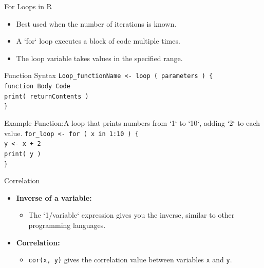 \documentclass{beamer}
\begin{document}
\begin{frame}{For Loops in R}
    \begin{itemize}
        \item Best used when the number of iterations is known.
        \item A `for` loop executes a block of code multiple times.
        \item The loop variable takes values in the specified range.
    \end{itemize}
        \begin{block}{Function Syntax}
        \texttt{Loop\_functionName <- loop ( parameters ) \{\\
        \quad function Body Code\\
        \quad print( returnContents )\\
        \}}
    \end{block}
        \begin{block}{Example Function:A loop that prints numbers from `1` to `10`, adding `2` to each value.}
        \texttt{for\_loop <- for ( x in 1:10 ) \{\\
        \quad y <- x + 2\\
        \quad print( y )\\
        \}}
    \end{block}

\end{frame}
\begin{frame}{Correlation}
    \begin{itemize}
        \item \textbf{Inverse of a variable:} 
        \begin{itemize}
            \item The `1/variable` expression gives you the inverse, similar to other programming languages.
        \end{itemize}
        
        \item \textbf{Correlation:} 
        \begin{itemize}
            \item \texttt{cor(x, y)} gives the correlation value between variables \texttt{x} and \texttt{y}.
        \end{itemize}
    \end{itemize}
\end{frame}
\end{document}
